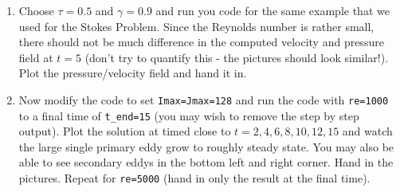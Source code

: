 \documentclass[11pt]{article}
\begin{document}
\begin{enumerate}
\begin{enumerate}
\item Choose $\tau=0.5$ and $\gamma=0.9$ and run you code for the same example that we used for the Stokes Problem.  Since the Reynolds number is rather small, there should not be much difference in the computed velocity and pressure field at $t=5$ (don't try to quantify this  - the pictures
should look similar!).  Plot the pressure/velocity field and hand it in.

\item Now modify the code to set \verb+Imax=Jmax=128+ and run the code with \verb+re=1000+ to a final time of \verb+t_end=15+ (you may wish to remove the step by step output).  Plot the solution at timed close to $t=2,4,6,8,10,12,15$ and watch the large single primary eddy grow to roughly steady state.
You may also be able to see secondary eddys in the bottom left and right corner. Hand in the pictures. Repeat for \verb+re=5000+ (hand in only the result at the final time).
\end{enumerate}


\end{enumerate}
\end{document}
